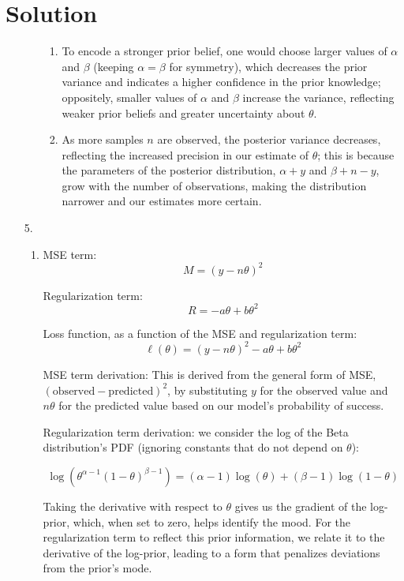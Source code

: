 \documentclass[submit]{harvardml}
\newenvironment{answer}
  {\section*{Solution}}
{}
\begin{document}
\begin{answer}
\begin{enumerate}
\begin{enumerate}
\begin{enumerate}
                \item
To encode a stronger prior belief, one would choose larger values of \(\alpha\) and \(\beta\) (keeping \(\alpha = \beta\) for symmetry), which decreases the prior variance and indicates a higher confidence in the prior knowledge; oppositely, smaller values of \(\alpha\) and \(\beta\) increase the variance, reflecting weaker prior beliefs and greater uncertainty about \(\theta\).
                \item
As more samples \(n\) are observed, the posterior variance decreases, reflecting the increased precision in our estimate of \(\theta\); this is because the parameters of the posterior distribution, \(\alpha + y\) and \(\beta + n - y\), grow with the number of observations, making the distribution narrower and our estimates more certain.
              \end{enumerate}

      \end{enumerate}
    \item[5.]

      \begin{enumerate}
        \item
              MSE term:
              \[
                M = (y - n\theta)^2
              \]

              Regularization term:
              \[
                R = -a\theta + b\theta^2
              \]

              Loss function, as a function of the MSE and regularization term:
              \[
                \ell(\theta) = (y - n\theta)^2 - a\theta + b\theta^2
              \]

              MSE term derivation: This is derived from the general form of MSE, \((\text{observed} - \text{predicted})^2\), by substituting \(y\) for the observed value and \(n\theta\) for the predicted value based on our model's probability of success.

              Regularization term derivation: we consider the log of the Beta distribution's PDF (ignoring constants that do not depend on \(\theta\)):

\[\log(\theta^{\alpha-1}(1-\theta)^{\beta-1}) = (\alpha-1)\log(\theta) + (\beta-1)\log(1-\theta)\]

Taking the derivative with respect to \(\theta\) gives us the gradient of the log-prior, which, when set to zero, helps identify the mood. For the regularization term to reflect this prior information, we relate it to the derivative of the log-prior, leading to a form that penalizes deviations from the prior's mode.


\end{enumerate}
\end{enumerate}
\end{answer}
\end{document}
